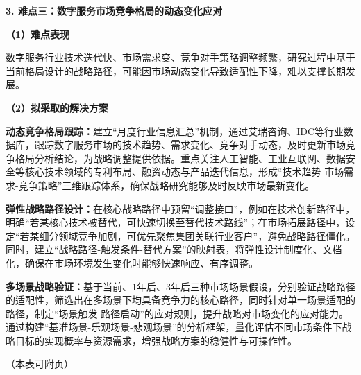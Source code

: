 \documentclass[UTF8, a4paper, 11pt]{ctexart}
\begin{document}
\begin{UnifiedBox}
\vspace{0.3cm}
\noindent \textbf{3. 难点三：数字服务市场竞争格局的动态变化应对}

\vspace{0.2cm}
\noindent \textbf{（1）难点表现}

数字服务行业技术迭代快、市场需求变、竞争对手策略调整频繁，研究过程中基于当前格局设计的战略路径，可能因市场动态变化导致适配性下降，难以支撑长期发展。

\vspace{0.2cm}
\noindent \textbf{（2）拟采取的解决方案}

\noindent \textbf{动态竞争格局跟踪：}建立``月度行业信息汇总''机制，通过艾瑞咨询、IDC等行业数据库，跟踪数字服务市场的技术趋势、需求变化、竞争对手动态，及时更新市场竞争格局分析结论，为战略调整提供依据。重点关注人工智能、工业互联网、数据安全等核心技术领域的专利布局、融资动态与产品迭代信息，形成``技术趋势-市场需求-竞争策略''三维跟踪体系，确保战略研究能够及时反映市场最新变化。

\noindent \textbf{弹性战略路径设计：}在核心战略路径中预留``调整接口''，例如在技术创新路径中，明确``若某核心技术被替代，可快速切换至替代技术路线''；在市场拓展路径中，设定``若某细分领域竞争加剧，可优先聚焦集团关联行业客户''，避免战略路径僵化。同时，建立``战略路径-触发条件-替代方案''的映射表，将弹性设计制度化、文档化，确保在市场环境发生变化时能够快速响应、有序调整。

\noindent \textbf{多场景战略验证：}基于当前、1年后、3年后三种市场场景假设，分别验证战略路径的适配性，筛选出在多场景下均具备竞争力的核心路径，同时针对单一场景适配的路径，制定``场景触发-路径启动''的应对规则，提升战略对市场变化的应对能力。通过构建``基准场景-乐观场景-悲观场景''的分析框架，量化评估不同市场条件下战略目标的实现概率与资源需求，增强战略方案的稳健性与可操作性。

\vspace{8cm}

\begin{flushright} （本表可附页） \end{flushright}
\end{UnifiedBox}

\newpage

\vspace{0.6cm}

\vspace{0.3cm}
\end{document}
